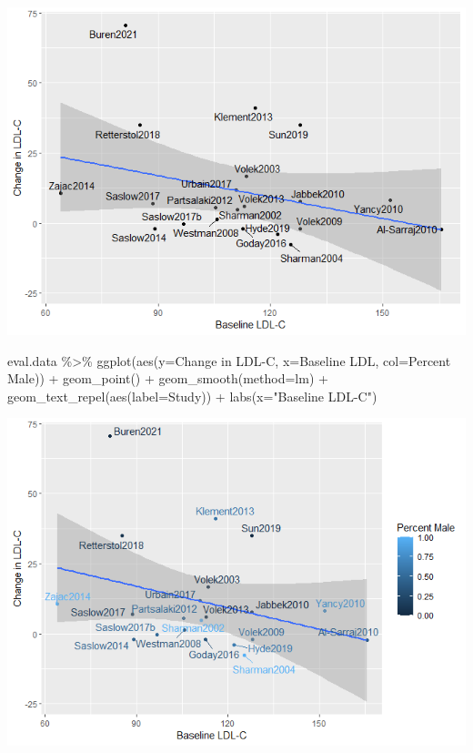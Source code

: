 \documentclass[
]{article}
\newenvironment{Shaded}{\begin{snugshade}}{\end{snugshade}}
\newcommand{\AttributeTok}[1]{\textcolor[rgb]{0.77,0.63,0.00}{#1}}
\newcommand{\FunctionTok}[1]{\textcolor[rgb]{0.00,0.00,0.00}{#1}}
\newcommand{\NormalTok}[1]{#1}
\newcommand{\SpecialCharTok}[1]{\textcolor[rgb]{0.00,0.00,0.00}{#1}}
\newcommand{\StringTok}[1]{\textcolor[rgb]{0.31,0.60,0.02}{#1}}
\begin{document}
\includegraphics{figures/ldl-change-vs-baseline-1.png}

\begin{Shaded}
\begin{Highlighting}[]
\NormalTok{eval.data }\SpecialCharTok{\%\textgreater{}\%}
  \FunctionTok{ggplot}\NormalTok{(}\FunctionTok{aes}\NormalTok{(}\AttributeTok{y=}\StringTok{\textasciigrave{}}\AttributeTok{Change in LDL{-}C}\StringTok{\textasciigrave{}}\NormalTok{,}
             \AttributeTok{x=}\StringTok{\textasciigrave{}}\AttributeTok{Baseline LDL}\StringTok{\textasciigrave{}}\NormalTok{,}
             \AttributeTok{col=}\StringTok{\textasciigrave{}}\AttributeTok{Percent Male}\StringTok{\textasciigrave{}}\NormalTok{)) }\SpecialCharTok{+}
  \FunctionTok{geom\_point}\NormalTok{() }\SpecialCharTok{+}
  \FunctionTok{geom\_smooth}\NormalTok{(}\AttributeTok{method=}\StringTok{\textquotesingle{}lm\textquotesingle{}}\NormalTok{) }\SpecialCharTok{+}
  \FunctionTok{geom\_text\_repel}\NormalTok{(}\FunctionTok{aes}\NormalTok{(}\AttributeTok{label=}\NormalTok{Study)) }\SpecialCharTok{+}
  \FunctionTok{labs}\NormalTok{(}\AttributeTok{x=}\StringTok{"Baseline LDL{-}C"}\NormalTok{)}
\end{Highlighting}
\end{Shaded}

\includegraphics{figures/ldl-change-vs-baseline-2.png}
\end{document}
